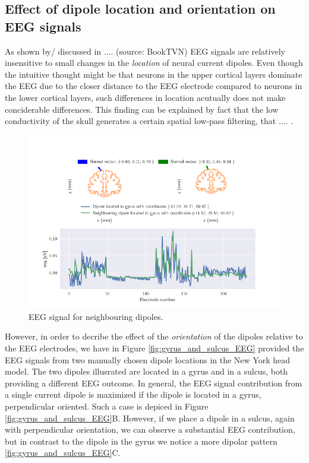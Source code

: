 \documentclass[a4paper, UKenglish, 11pt]{uiomaster}
\begin{document}
\subsection{Effect of dipole location and orientation on EEG signals}
As shown by/ discussed in .... (source: BookTVN) EEG signals are relatively insensitive to small changes in the \emph{location} of neural current dipoles. Even though the intuitive thought might be that neurons in the upper cortical layers dominate the EEG due to the closer distance to the EEG electrode compared to neurons in the lower cortical layers, such differences in location acutually does not make conciderable differences. This finding can be explained by fact that the low conductivity of the skull generates a certain spatial low-pass filtering, that .... .

\begin{figure}[!htb]
    \centering
    \includegraphics[width=\linewidth]{figures/neighbour_dipoles.png}
    \caption{EEG signal for neighbouring dipoles.}
    \label{fig:neighbour_dipoles}
\end{figure}

However, in order to decribe the effect of the \emph{orientation} of the dipoles relative to the EEG electrodes, we have in Figure \ref{fig:gyrus_and_sulcus_EEG} provided the EEG signals from two manually chosen dipole locations in the New York head model. The two dipoles illusrated are located in a gyrus and in a sulcus, both providing a different EEG outcome. In general, the EEG signal contribution from a single current dipole is maximized if the dipole is located in a gyrus, perpendicular oriented. Such a case is depiced in Figure \ref{fig:gyrus_and_sulcus_EEG}B. However, if we place a dipole in a sulcus, again with perpendicular orientation, we can observe a substantial EEG contribution, but in contrast to the dipole in the gyrus we notice a more dipolar pattern \ref{fig:gyrus_and_sulcus_EEG}C.
\end{document}
